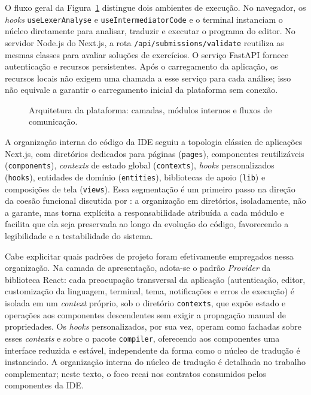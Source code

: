 O fluxo geral da Figura~\ref{fig:arquitetura-plataforma} distingue dois ambientes de execução. No navegador, os \textit{hooks} \texttt{useLexerAnalyse} e \texttt{useIntermediatorCode} e o terminal instanciam o núcleo diretamente para analisar, traduzir e executar o programa do editor. No servidor Node.js do Next.js, a rota \texttt{/api/submissions/validate} reutiliza as mesmas classes para avaliar soluções de exercícios. O serviço FastAPI fornece autenticação e recursos persistentes. Após o carregamento da aplicação, os recursos locais não exigem uma chamada a esse serviço para cada análise; isso não equivale a garantir o carregamento inicial da plataforma sem conexão.

\begin{figure}[htbp]
    \centering
    \caption[Arquitetura da plataforma.]{Arquitetura da plataforma: camadas, módulos internos e fluxos de comunicação.}
    \label{fig:arquitetura-plataforma}
    \resizebox{\linewidth}{!}{}
\end{figure}

A organização interna do código da IDE seguiu a topologia clássica de aplicações Next.js, com diretórios dedicados para páginas (\texttt{pages}), componentes reutilizáveis (\texttt{components}), \textit{contexts} de estado global (\texttt{contexts}), \textit{hooks} personalizados (\texttt{hooks}), entidades de domínio (\texttt{entities}), bibliotecas de apoio (\texttt{lib}) e composições de tela (\texttt{views}). Essa segmentação é um primeiro passo na direção da coesão funcional discutida por : a organização em diretórios, isoladamente, não a garante, mas torna explícita a responsabilidade atribuída a cada módulo e facilita que ela seja preservada ao longo da evolução do código, favorecendo a legibilidade e a testabilidade do sistema.

Cabe explicitar quais padrões de projeto foram efetivamente empregados nessa organização. Na camada de apresentação, adota-se o padrão \textit{Provider} da biblioteca React: cada preocupação transversal da aplicação (autenticação, editor, customização da linguagem, terminal, tema, notificações e erros de execução) é isolada em um \textit{context} próprio, sob o diretório \texttt{contexts}, que expõe estado e operações aos componentes descendentes sem exigir a propagação manual de propriedades. Os \textit{hooks} personalizados, por sua vez, operam como fachadas sobre esses \textit{contexts} e sobre o pacote \texttt{compiler}, oferecendo aos componentes uma interface reduzida e estável, independente da forma como o núcleo de tradução é instanciado. A organização interna do núcleo de tradução é detalhada no trabalho complementar; neste texto, o foco recai nos contratos consumidos pelos componentes da IDE.

